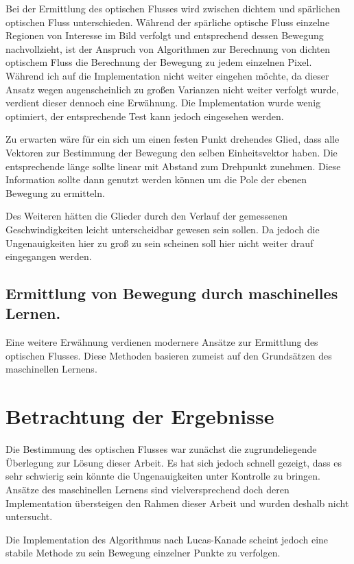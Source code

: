Bei der Ermittlung des optischen Flusses wird zwischen dichtem und spärlichen optischen Fluss unterschieden.
Während der spärliche optische Fluss einzelne Regionen von Interesse im Bild verfolgt und entsprechend dessen Bewegung nachvollzieht, ist der Anspruch von Algorithmen zur Berechnung von dichten optischem Fluss die Berechnung der Bewegung zu jedem einzelnen Pixel.
Während ich auf die Implementation nicht weiter eingehen möchte, da dieser Ansatz wegen augenscheinlich zu großen Varianzen nicht weiter verfolgt wurde, verdient dieser dennoch eine Erwähnung.
Die Implementation wurde wenig optimiert, der entsprechende Test kann jedoch eingesehen werden.

Zu erwarten wäre für ein sich um einen festen Punkt drehendes Glied, dass alle Vektoren zur Bestimmung der Bewegung den selben Einheitsvektor haben.
Die entsprechende länge sollte linear mit Abstand zum Drehpunkt zunehmen.
Diese Information sollte dann genutzt werden können um die Pole der ebenen Bewegung zu ermitteln.

Des Weiteren hätten die Glieder durch den Verlauf der gemessenen Geschwindigkeiten leicht unterscheidbar gewesen sein sollen.
Da jedoch die Ungenauigkeiten hier zu groß zu sein scheinen soll hier nicht weiter drauf eingegangen werden.


\subsection{Ermittlung von Bewegung durch maschinelles Lernen.}

Eine weitere Erwähnung verdienen modernere Ansätze zur Ermittlung des optischen Flusses.
Diese Methoden basieren zumeist auf den Grundsätzen des maschinellen Lernens.


\section{Betrachtung der Ergebnisse}

Die Bestimmung des optischen Flusses war zunächst die zugrundeliegende Überlegung zur Lösung dieser Arbeit.
Es hat sich jedoch schnell gezeigt, dass es sehr schwierig sein könnte die Ungenauigkeiten unter Kontrolle zu bringen.
Ansätze des maschinellen Lernens sind vielversprechend doch deren Implementation übersteigen den Rahmen dieser Arbeit und wurden deshalb nicht untersucht.

Die Implementation des Algorithmus nach Lucas-Kanade scheint jedoch eine stabile Methode zu sein Bewegung einzelner Punkte zu verfolgen.


